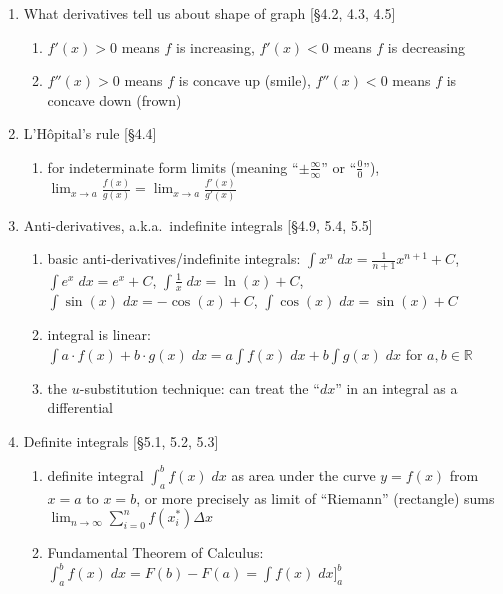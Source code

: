 \documentclass[11pt]{article}
\begin{document}
\begin{enumerate}
\item What derivatives tell us about shape of graph [\S 4.2, 4.3, 4.5]
\begin{enumerate}
\item $f'(x)>0$ means $f$ is increasing, $f'(x) <0$ means $f$ is decreasing
\item $f''(x)>0$ means $f$ is concave up (smile), $f''(x) <0$ means $f$ is concave down (frown)
\end{enumerate}

\item L'H\^{o}pital's rule [\S 4.4]
\begin{enumerate}
\item for indeterminate form limits (meaning ``$\pm \frac{\infty}{\infty}$'' or ``$\frac{0}{0}$''), $\lim_{x\to a} \frac{f(x)}{g(x)} = \lim_{x\to a} \frac{f'(x)}{g'(x)}$
\end{enumerate}

\item Anti-derivatives, a.k.a.~indefinite integrals [\S 4.9, 5.4, 5.5]
\begin{enumerate}
\item basic anti-derivatives/indefinite integrals: $\int x^n \; dx = \frac{1}{n+1}x^{n+1}+C$, $\int e^x \; dx = e^x + C$, $\int \frac{1}{x} \; dx = \ln(x) + C$, $\int \sin(x) \; dx = -\cos(x) +C$, $\int \cos(x) \; dx = \sin(x) + C$
\item integral is linear: $\int a\cdot f(x) + b\cdot g(x) \; dx = a\int f(x) \; dx + b \int g(x) \; dx$ for $a,b\in \mathbb{R}$
\item the $u$-substitution technique: can treat the ``$dx$'' in an integral as a differential
\end{enumerate}

\item Definite integrals [\S 5.1, 5.2, 5.3]
\begin{enumerate}
\item definite integral $\int_{a}^{b} f(x) \; dx$ as area under the curve $y=f(x)$ from $x=a$ to $x=b$, or more precisely as limit of ``Riemann'' (rectangle) sums $\lim_{n \to \infty} \sum_{i=0}^{n} f(x^{*}_i) \Delta x$
\item Fundamental Theorem of Calculus: $\int_{a}^{b} f(x) \; dx = F(b)-F(a) =\int f(x) \; dx \big ]_{a}^{b}$ 
\end{enumerate}

\end{enumerate}
\end{document}
